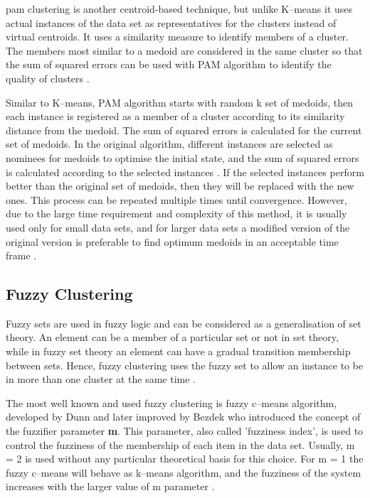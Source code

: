 \acrfull{pam} clustering is another centroid-based technique, but unlike K--means it uses actual instances of the data set as representatives for the clusters instead of virtual centroids. It uses a similarity measure to identify members of a cluster. The members most similar to a medoid are considered in the same cluster so that the sum of squared errors can be used with PAM algorithm to identify the quality of clusters \cite{Kaufman1990}.

Similar to K--means, PAM algorithm starts with random k set of medoids, then each instance is registered as a member of a cluster according to its similarity distance from the medoid. The sum of squared errors is calculated for the current set of medoids. In the original algorithm, different instances are selected as nominees for medoids to optimise the initial state, and the sum of squared errors is calculated according to the selected instances \cite{Kaufman1990}. If the selected instances perform better than the original set of medoids, then they will be replaced with the new ones. This process can be repeated multiple times until convergence. However, due to the large time requirement and complexity of this method, it is usually used only for small data sets, and for larger data sets a modified version of the original version is preferable to find optimum medoids in an acceptable time frame \cite{Ng2002}. 

\subsection{Fuzzy Clustering}

Fuzzy sets are used in fuzzy logic and can be considered as a generalisation of set theory. An element can be a member of a particular set or not in set theory, while in fuzzy set theory an element can have a gradual transition membership between sets. Hence, fuzzy clustering uses the fuzzy set to allow an instance to be in more than one cluster at the same time \cite{Wang2006}. 

The most well known and used fuzzy clustering is fuzzy c--means algorithm, developed by Dunn \cite{Dunn1973a} and later improved by Bezdek \cite{Jain1999} who introduced the concept of the fuzzifier parameter \textbf{m}. This parameter, also called 'fuzziness index', is used to control the fuzziness of the membership of each item in the data set. Usually, m = 2 is used without any particular theoretical basis for this choice. For m = 1 the fuzzy c--means will behave as k--means algorithm, and the fuzziness of the system increases with the larger value of m parameter \cite{Bezdek1981}. 

